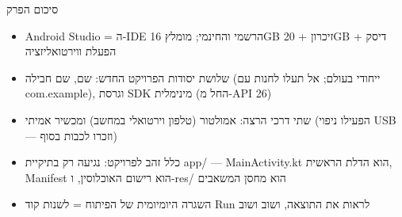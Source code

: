 \begin{tcbsummary}{סיכום הפרק}
\begin{itemize}
  \item Android Studio = ה-IDE הרשמי והחינמי; מומלץ 16GB זיכרון + 20GB דיסק + הפעלת ווירטואליזציה
  \item שלושת יסודות הפרויקט החדש: שם, שם חבילה (ייחודי בעולם; אל תעלו לחנות עם com.example), וגרסת SDK מינימלית (החל מ-API 26)
  \item שתי דרכי הרצה: אמולטור (טלפון וירטואלי במחשב) ומכשיר אמיתי (הפעילו ניפוי USB — וזכרו לכבות בסוף)
  \item כלל זהב לפרויקט: נגיעה רק בתיקיית app/ — MainActivity.kt הוא הדלת הראשית, Manifest הוא רישום האוכלוסין, ו-res/ הוא מחסן המשאבים
  \item השגרה היומיומית של הפיתוח = לשנות קוד Run לראות את התוצאה, ושוב ושוב
\end{itemize}

\end{tcbsummary}
